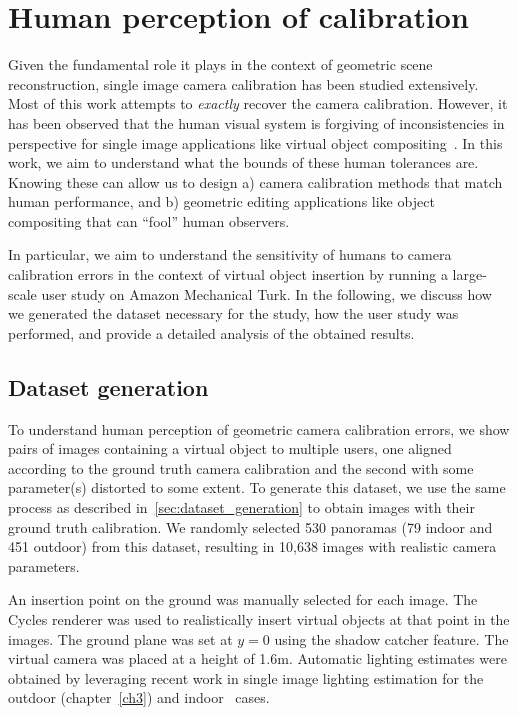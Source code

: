 \section{Human perception of calibration}
\label{sec:human_sensitivity_analysis}

Given the fundamental role it plays in the context of geometric scene reconstruction, single image camera calibration has been studied extensively. Most of this work attempts to \emph{exactly} recover the camera calibration. However, it has been observed that the human visual system is forgiving of inconsistencies in perspective for single image applications like virtual object compositing~\cite{karsch2014automatic}. In this work, we aim to understand what the bounds of these human tolerances are. Knowing these can allow us to design a) camera calibration methods that match human performance, and b) geometric editing applications like object compositing that can ``fool'' human observers.

In particular, we aim to understand the sensitivity of humans to camera calibration errors in the context of virtual object insertion by running a large-scale user study on Amazon Mechanical Turk. In the following, we discuss how we generated the dataset necessary for the study, how the user study was performed, and provide a detailed analysis of the obtained results.


\subsection{Dataset generation}
\label{sec:dataset_organization}

To understand human perception of geometric camera calibration errors, we show pairs of images containing a virtual object to multiple users, one aligned according to the ground truth camera calibration and the second with some parameter(s) distorted to some extent. To generate this dataset, we use the same process as described in~\ref{sec:dataset_generation} to obtain images with their ground truth calibration. We randomly selected 530 panoramas (79 indoor and 451 outdoor) from this dataset, resulting in 10,638 images with realistic camera parameters. 

An insertion point on the ground was manually selected for each image. The Cycles renderer was used to realistically insert virtual objects at that point in the images. The ground plane was set at $y=0$ using the shadow catcher feature. The virtual camera was placed at a height of 1.6m. Automatic lighting estimates were obtained by leveraging recent work in single image lighting estimation for the outdoor (chapter~\ref{ch3}) and indoor~\cite{gardner-sigasia-17} cases. 


